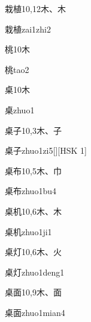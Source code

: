 \begin{entry}{栽植}{10,12}{⽊、⽊}
  \begin{phonetics}{栽植}{zai1zhi2}
  \end{phonetics}
\end{entry}

\begin{entry}{桃}{10}{⽊}
  \begin{phonetics}{桃}{tao2}
  \end{phonetics}
\end{entry}

\begin{entry}{桌}{10}{⽊}
  \begin{phonetics}{桌}{zhuo1}
  \end{phonetics}
\end{entry}

\begin{entry}{桌子}{10,3}{⽊、⼦}
  \begin{phonetics}{桌子}{zhuo1zi5}[][HSK 1]
  \end{phonetics}
\end{entry}

\begin{entry}{桌布}{10,5}{⽊、⼱}
  \begin{phonetics}{桌布}{zhuo1bu4}
  \end{phonetics}
\end{entry}

\begin{entry}{桌机}{10,6}{⽊、⽊}
  \begin{phonetics}{桌机}{zhuo1ji1}
  \end{phonetics}
\end{entry}

\begin{entry}{桌灯}{10,6}{⽊、⽕}
  \begin{phonetics}{桌灯}{zhuo1deng1}
  \end{phonetics}
\end{entry}

\begin{entry}{桌面}{10,9}{⽊、⾯}
  \begin{phonetics}{桌面}{zhuo1mian4}
  \end{phonetics}
\end{entry}

